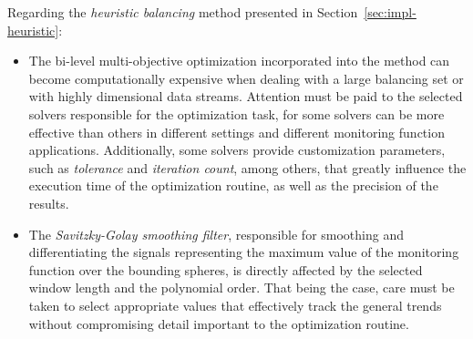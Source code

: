 Regarding the \emph{heuristic balancing} method presented in Section~\ref{sec:impl-heuristic}:
\begin{itemize}
\item The bi-level multi-objective optimization incorporated into the method can become computationally expensive when dealing with a large balancing set or with highly dimensional data streams. Attention must be paid to the selected solvers responsible for the optimization task, for some solvers can be more effective than others in different settings and different monitoring function applications. Additionally, some solvers provide customization parameters, such as \emph{tolerance} and \emph{iteration count}, among others, that greatly influence the execution time of the optimization routine, as well as the precision of the results.
\item The \emph{Savitzky-Golay smoothing filter}, responsible for smoothing and differentiating the signals representing the maximum value of the monitoring function over the bounding spheres, is directly affected by the selected window length and the polynomial order. That being the case, care must be taken to select appropriate values that effectively track the general trends without compromising detail important to the optimization routine.
\end{itemize}